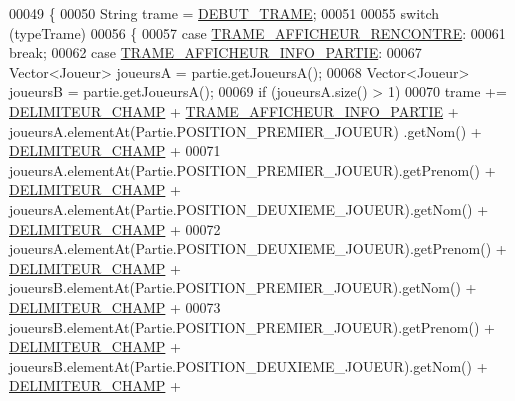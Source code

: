 \begin{DoxyCode}
00049     \{
00050         String trame = \hyperlink{classcom_1_1example_1_1area_1_1_protocol_a_r_e_a_ad9aa917d162b8de3234b65ba294803ee}{DEBUT\_TRAME};
00051 
00055         \textcolor{keywordflow}{switch} (typeTrame)
00056         \{
00057             \textcolor{keywordflow}{case} \hyperlink{classcom_1_1example_1_1area_1_1_protocol_a_r_e_a_a6a896dcb5c52062dbeab426b93e566fc}{TRAME\_AFFICHEUR\_RENCONTRE}:
00061                 \textcolor{keywordflow}{break};
00062             \textcolor{keywordflow}{case} \hyperlink{classcom_1_1example_1_1area_1_1_protocol_a_r_e_a_a4f5be4d0653ad5f52ae5f5c673ec728d}{TRAME\_AFFICHEUR\_INFO\_PARTIE}:
00067                 Vector<Joueur> joueursA = partie.getJoueursA();
00068                 Vector<Joueur> joueursB = partie.getJoueursA();
00069                 \textcolor{keywordflow}{if} (joueursA.size() > 1)
00070                     trame += \hyperlink{classcom_1_1example_1_1area_1_1_protocol_a_r_e_a_afec644c1c2a6563a0ee16a689044433c}{DELIMITEUR\_CHAMP} + 
      \hyperlink{classcom_1_1example_1_1area_1_1_protocol_a_r_e_a_a4f5be4d0653ad5f52ae5f5c673ec728d}{TRAME\_AFFICHEUR\_INFO\_PARTIE} + joueursA.elementAt(Partie.POSITION\_PREMIER\_JOUEUR)
      .getNom() + \hyperlink{classcom_1_1example_1_1area_1_1_protocol_a_r_e_a_afec644c1c2a6563a0ee16a689044433c}{DELIMITEUR\_CHAMP} +
00071                             joueursA.elementAt(Partie.POSITION\_PREMIER\_JOUEUR).getPrenom() + 
      \hyperlink{classcom_1_1example_1_1area_1_1_protocol_a_r_e_a_afec644c1c2a6563a0ee16a689044433c}{DELIMITEUR\_CHAMP} + joueursA.elementAt(Partie.POSITION\_DEUXIEME\_JOUEUR).getNom() + 
      \hyperlink{classcom_1_1example_1_1area_1_1_protocol_a_r_e_a_afec644c1c2a6563a0ee16a689044433c}{DELIMITEUR\_CHAMP} +
00072                             joueursA.elementAt(Partie.POSITION\_DEUXIEME\_JOUEUR).getPrenom() + 
      \hyperlink{classcom_1_1example_1_1area_1_1_protocol_a_r_e_a_afec644c1c2a6563a0ee16a689044433c}{DELIMITEUR\_CHAMP} + joueursB.elementAt(Partie.POSITION\_PREMIER\_JOUEUR).getNom() + 
      \hyperlink{classcom_1_1example_1_1area_1_1_protocol_a_r_e_a_afec644c1c2a6563a0ee16a689044433c}{DELIMITEUR\_CHAMP} +
00073                             joueursB.elementAt(Partie.POSITION\_PREMIER\_JOUEUR).getPrenom() + 
      \hyperlink{classcom_1_1example_1_1area_1_1_protocol_a_r_e_a_afec644c1c2a6563a0ee16a689044433c}{DELIMITEUR\_CHAMP} + joueursB.elementAt(Partie.POSITION\_DEUXIEME\_JOUEUR).getNom() + 
      \hyperlink{classcom_1_1example_1_1area_1_1_protocol_a_r_e_a_afec644c1c2a6563a0ee16a689044433c}{DELIMITEUR\_CHAMP} +

\end{DoxyCode}
